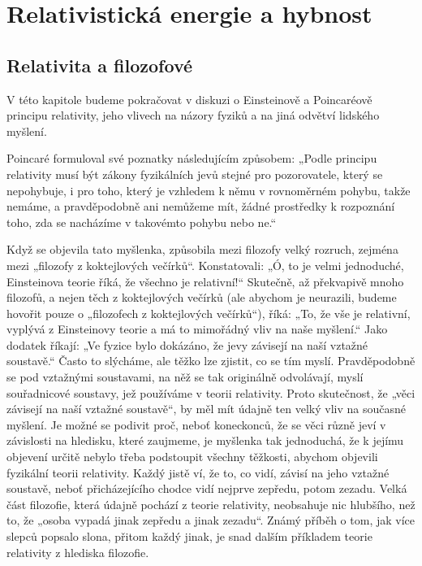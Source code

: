 \setchaptertoc
\chapter{Relativistická energie a hybnost}\label{fyz:IchapXVI}

  \section{Relativita a filozofové}\label{fyz:IchapXVIsecI}
    V této kapitole budeme pokračovat v diskuzi o Einsteinově a Poincaréově principu relativity, 
    jeho vlivech na názory fyziků a na jiná odvětví lidského myšlení.
    
    Poincaré formuloval své poznatky následujícím způsobem: „Podle principu relativity musí být 
    zákony fyzikálních jevů stejné pro pozorovatele, který se nepohybuje, i pro toho, který je 
    vzhledem k němu v rovnoměrném pohybu, takže nemáme, a pravděpodobně ani nemůžeme mít, žádné 
    prostředky k rozpoznání toho, zda se nacházíme v takovémto pohybu nebo ne.“
    
    Když se objevila tato myšlenka, způsobila mezi filozofy velký rozruch, zejména mezi „filozofy z 
    koktejlových večírků“. Konstatovali: „Ó, to je velmi jednoduché, Einsteinova teorie říká, že 
    všechno je relativní!“ Skutečně, až překvapivě mnoho filozofů, a nejen těch z koktejlových 
    večírků (ale abychom je neurazili, budeme hovořit pouze o „filozofech z koktejlových večírků“), 
    říká: „To, že vše je relativní, vyplývá z Einsteinovy teorie a má to mimořádný vliv na naše 
    myšlení.“ Jako dodatek říkají: „Ve fyzice bylo dokázáno, že jevy závisejí na naší vztažné 
    soustavě.“ Často to slýcháme, ale těžko lze zjistit, co se tím myslí. Pravděpodobně se pod 
    vztažnými soustavami, na něž se tak originálně odvolávají, myslí souřadnicové soustavy, jež 
    používáme v teorii relativity. Proto skutečnost, že „věci závisejí na naší vztažné soustavě“, 
    by měl mít údajně ten velký vliv na současné myšlení. Je možné se podivit proč, neboť 
    koneckonců, že se věci různě jeví v závislosti na hledisku, které zaujmeme, je myšlenka tak 
    jednoduchá, že k jejímu objevení určitě nebylo třeba podstoupit všechny těžkosti, abychom 
    objevili fyzikální teorii relativity. Každý jistě ví, že to, co vidí, závisí na jeho vztažné 
    soustavě, neboť přicházejícího chodce vidí nejprve zepředu, potom zezadu. Velká část filozofie, 
    která údajně pochází z teorie relativity, neobsahuje nic hlubšího, než to, že „osoba vypadá 
    jinak zepředu a jinak zezadu“. Známý příběh o tom, jak více slepců popsalo slona, přitom každý 
    jinak, je snad dalším příkladem teorie relativity z hlediska filozofie.
    
